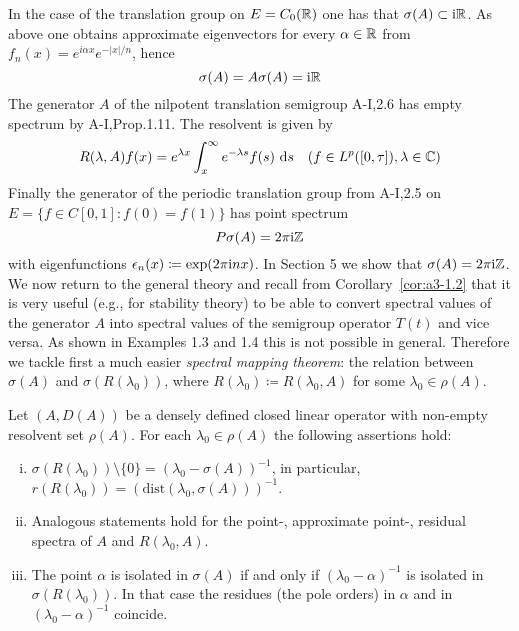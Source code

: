 In the case of the translation group on $E = C_{0}(\mathbb{R})$ one has that $\sigma(A) \subset \mathrm{i}\mathbb{R}$.
As above one obtains approximate eigenvectors for every $\alpha \in \mathbb{R}$ from $f_{n}(x) = e^{i\alpha x}e^{-|x|/n}$, hence
\[
\sigma(A) = A\sigma(A) = \mathrm{i}\mathbb{R}
\]
The generator $A$ of the nilpotent translation semigroup A-I,2.6 has empty spectrum by A-I,Prop.1.11.
The resolvent is given by
\[
R(\lambda,A)f(x) = e^{\lambda x}\int_{x}^{\infty}e^{-\lambda s}f(s) \, \mathop{}\!\mathrm{d}{s} \quad (f \in L^{p}([0,\tau]), \lambda \in \mathbb{C})
\]
Finally the generator of the periodic translation group from A-I,2.5 on $E = \{f \in C[0,1] \colon f(0) = f(1)\}$ has point spectrum
\[
P\sigma(A) = 2\pi \mathrm{i}\mathbb{Z}
\]
with eigenfunctions $\epsilon_{n}(x) \coloneqq \exp(2\pi \mathrm{i} n x)$.
In Section 5 we show that $\sigma(A) = 2\pi \mathrm{i}\mathbb{Z}$.
We now return to the general theory and recall from Corollary~\ref{cor:a3-1.2} that it is very useful (e.g., for stability theory) to be able to convert
spectral values of the generator $A$ into spectral values of the semigroup operator $T(t)$ and vice versa.
As shown in Examples 1.3 and 1.4 this is not possible in general.
Therefore we tackle first a much easier \emph{spectral mapping theorem}: the relation between $\sigma(A)$ and $\sigma(R(\lambda_{0}))$, where $R(\lambda_{0}) \coloneqq R(\lambda_{0},A)$ for some $\lambda_{0} \in \rho(A)$.
\begin{proposition}\label{prop:a3-2.5}
Let $(A,D(A))$ be a densely defined closed linear operator with non-empty resolvent set $\rho(A)$.
For each $\lambda_{0} \in \rho(A)$ the following assertions hold:

\begin{enumerate}[(i)]
\item 
$\sigma(R(\lambda_{0})) \setminus \{0\} = (\lambda_{0} - \sigma(A))^{-1}$, in  particular, $r(R(\lambda_{0})) = (\text{dist}(\lambda_{0},\sigma(A)))^{-1}$.

\item 
Analogous statements hold for the point-, approximate point-, residual spectra of $A$ and $R(\lambda_{0},A)$.

\item 
The point $\alpha$ is isolated in $\sigma(A)$ if and only if $(\lambda_{0}-\alpha)^{-1}$ is isolated in $\sigma(R(\lambda_{0}))$.
In that case the residues (\resp the pole orders) in $\alpha$ and in $(\lambda_{0}-\alpha)^{-1}$ coincide.
\end{enumerate}
\end{proposition}
